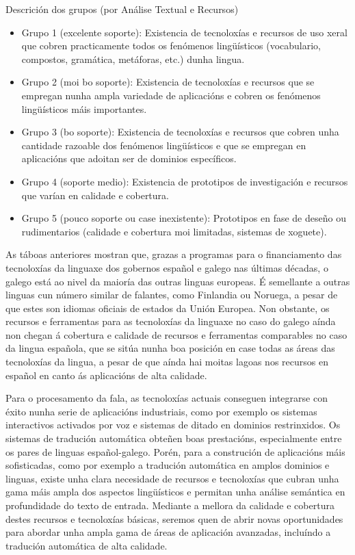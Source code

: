 \begin{multicols}{2}
Descrición dos grupos (por Análise Textual e Recursos)
	\begin{itemize}
	\item Grupo 1 (excelente soporte): Existencia de tecnoloxías e recursos de uso xeral que cobren practicamente todos os fenómenos lingüísticos (vocabulario, compostos, gramática, metáforas, etc.) dunha lingua.
	\item Grupo 2 (moi bo soporte): Existencia de tecnoloxías e recursos que se empregan nunha ampla variedade de aplicacións e cobren os fenómenos lingüísticos máis importantes.
	\item Grupo 3 (bo soporte): Existencia de tecnoloxías e recursos que cobren unha cantidade razoable dos fenómenos lingüísticos e que se empregan en aplicacións que adoitan ser de dominios específicos.
	\item Grupo 4 (soporte medio): Existencia de prototipos de investigación e recursos que varían en calidade e cobertura.
	\item Grupo 5 (pouco soporte ou case inexistente): Prototipos en fase de deseño ou rudimentarios (calidade e cobertura moi limitadas, sistemas de xoguete).
	\end{itemize}

As táboas anteriores mostran que, grazas a programas para o financiamento das tecnoloxías da linguaxe dos gobernos español e galego nas últimas décadas, o galego está ao nivel da maioría das outras linguas europeas. É semellante a outras linguas cun número similar de falantes, como Finlandia ou Noruega, a pesar de que estes son idiomas oficiais de estados da Unión Europea. Non obstante, os recursos e ferramentas para as tecnoloxías da linguaxe no caso do galego aínda non chegan á cobertura e calidade de recursos e ferramentas comparables no caso da lingua española, que se sitúa nunha boa posición en case todas as áreas das tecnoloxías da lingua, a pesar de que aínda hai moitas lagoas nos recursos en español en canto ás aplicacións de alta calidade.

Para o procesamento da fala, as tecnoloxías actuais conseguen integrarse con éxito nunha serie de aplicacións industriais, como por exemplo os sistemas interactivos activados por voz e sistemas de ditado en dominios restrinxidos. Os sistemas de tradución automática obteñen boas prestacións, especialmente entre os pares de linguas español-galego. Porén, para a construción de aplicacións máis sofisticadas, como por exemplo a tradución automática en amplos dominios e linguas, existe unha clara necesidade de recursos e tecnoloxías que cubran unha gama máis ampla dos aspectos lingüísticos e permitan unha análise semántica en profundidade do texto de entrada. Mediante a mellora da calidade e cobertura destes recursos e tecnoloxías básicas, seremos quen de abrir novas oportunidades para abordar unha ampla gama de áreas de aplicación avanzadas, incluíndo a tradución automática de alta calidade.


\end{multicols}
